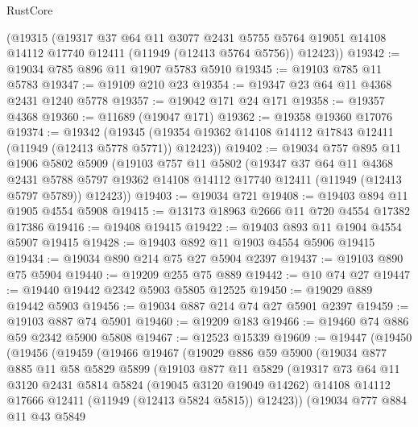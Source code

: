 \begin{lexlean}{RustCore}
\begin{coremodule}
    (@19315
      (@19317
        @37
        @64
        @11
        @3077
        @2431
        @5755
        @5764
        @19051
        @14108
        @14112
        @17740
        @12411
        (@11949 (@12413 @5764 @5756))
        @12423))
@19342 := @19034 @785 @896 @11 @1907 @5783 @5910
@19345 := @19103 @785 @11 @5783
@19347 := @19109 @210 @23
@19354 := @19347 @23 @64 @11 @4368 @2431 @1240 @5778
@19357 := @19042 @171 @24 @171
@19358 := @19357 @4368
@19360 := @11689 (@19047 @171)
@19362 := @19358 @19360 @17076
@19374 := @19342
    (@19345 (@19354 @19362 @14108 @14112 @17843 @12411 (@11949 (@12413 @5778 @5771)) @12423))
@19402 := @19034
    @757
    @895
    @11
    @1906
    @5802
    @5909
    (@19103
      @757
      @11
      @5802
      (@19347
        @37
        @64
        @11
        @4368
        @2431
        @5788
        @5797
        @19362
        @14108
        @14112
        @17740
        @12411
        (@11949 (@12413 @5797 @5789))
        @12423))
@19403 := @19034 @721
@19408 := @19403 @894 @11 @1905 @4554 @5908
@19415 := @13173 @18963 @2666 @11 @720 @4554 @17382 @17386
@19416 := @19408 @19415
@19422 := @19403 @893 @11 @1904 @4554 @5907 @19415
@19428 := @19403 @892 @11 @1903 @4554 @5906 @19415
@19434 := @19034 @890 @214 @75 @27 @5904 @2397
@19437 := @19103 @890 @75 @5904
@19440 := @19209 @255 @75 @889
@19442 := @10 @74 @27
@19447 := @19440 @19442 @2342 @5903 @5805 @12525
@19450 := @19029 @889 @19442 @5903
@19456 := @19034 @887 @214 @74 @27 @5901 @2397
@19459 := @19103 @887 @74 @5901
@19460 := @19209 @183
@19466 := @19460 @74 @886 @59 @2342 @5900 @5808
@19467 := @12523 @15339
@19609 := @19447
    (@19450
      (@19456
        (@19459
          (@19466
            @19467
            (@19029
              @886
              @59
              @5900
              (@19034
                @877
                @885
                @11
                @58
                @5829
                @5899
                (@19103
                  @877
                  @11
                  @5829
                  (@19317
                    @73
                    @64
                    @11
                    @3120
                    @2431
                    @5814
                    @5824
                    (@19045 @3120 @19049 @14262)
                    @14108
                    @14112
                    @17666
                    @12411
                    (@11949 (@12413 @5824 @5815))
                    @12423))
                (@19034
                  @777
                  @884
                  @11
                  @43
                  @5849

\end{coremodule}
\end{lexlean}
